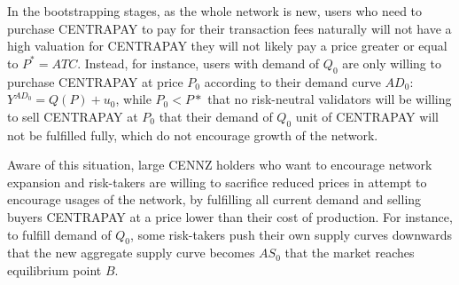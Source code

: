 \documentclass{article}
\newcommand\IS{\ensuremath{\mathit{AD}}}
\begin{document}

In the bootstrapping stages, as the whole network is new, users who need to purchase CENTRAPAY to pay for their transaction fees naturally will not have a high valuation for CENTRAPAY  they will not likely pay a price greater or equal to $P^*=ATC$. Instead, for instance, users with demand of $Q_0$ are only willing to purchase CENTRAPAY at price $P_0$ according to their demand curve $AD_0$:  $Y^{AD_0}=Q(P)+u_0$, while $P_0< P*$ that no risk-neutral validators will be willing to sell CENTRAPAY at $P_0$ that their demand of $Q_0$ unit of CENTRAPAY will not be fulfilled fully, which do not encourage growth of the network. \par

Aware of this situation, large CENNZ holders who want to encourage network expansion and risk-takers are willing to sacrifice reduced prices in attempt to encourage usages of the network, by fulfilling all current demand and selling buyers CENTRAPAY at a price lower than their cost of production. For instance, to fulfill demand of $Q_0$, some risk-takers push their own supply curves downwards that the new aggregate supply curve becomes $AS_0$ that the market reaches equilibrium point $B$. \par
\end{document}
